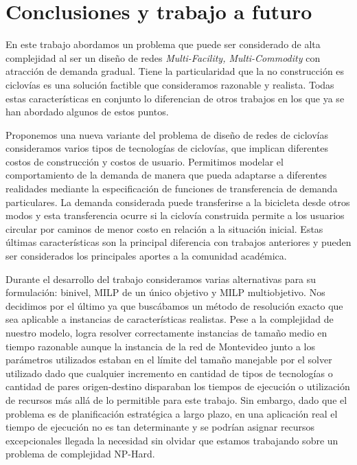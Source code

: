\chapter{Conclusiones y trabajo a futuro}

En este trabajo abordamos un problema que puede ser considerado de alta complejidad al ser un diseño de redes {\it Multi-Facility, Multi-Commodity} con atracción de demanda gradual. Tiene la particularidad que la no construcción es ciclovías es una solución factible que consideramos razonable y realista. Todas estas características en conjunto lo diferencian de otros trabajos en los que ya se han abordado algunos de estos puntos.

Proponemos una nueva variante del problema de diseño de redes de ciclovías consideramos varios tipos de tecnologías de ciclovías, que implican diferentes costos de construcción y costos de usuario. Permitimos modelar el comportamiento de la demanda de manera que pueda adaptarse a diferentes realidades mediante la especificación de funciones de transferencia de demanda particulares. La demanda considerada puede transferirse a la bicicleta desde otros modos y esta transferencia ocurre si la ciclovía construida permite a los usuarios circular por caminos de menor costo en relación a la situación inicial. Estas últimas características son la principal diferencia con trabajos anteriores y pueden ser considerados los principales aportes a la comunidad académica.

Durante el desarrollo del trabajo consideramos varias alternativas para su formulación: binivel, MILP de un único objetivo y MILP multiobjetivo. Nos decidimos por el último ya que buscábamos un método de resolución exacto que sea aplicable a instancias de características realistas. Pese a la complejidad de nuestro modelo, logra resolver correctamente instancias de tamaño medio en tiempo razonable aunque la instancia de la red de Montevideo junto a los parámetros utilizados estaban en el límite del tamaño manejable por el solver utilizado dado que cualquier incremento en cantidad de tipos de tecnologías o cantidad de pares origen-destino disparaban los tiempos de ejecución o utilización de recursos más allá de lo permitible para este trabajo. Sin embargo, dado que el problema es de planificación estratégica a largo plazo, en una aplicación real el tiempo de ejecución no es tan determinante y se podrían asignar recursos excepcionales llegada la necesidad sin olvidar que estamos trabajando sobre un problema de complejidad NP-Hard.

